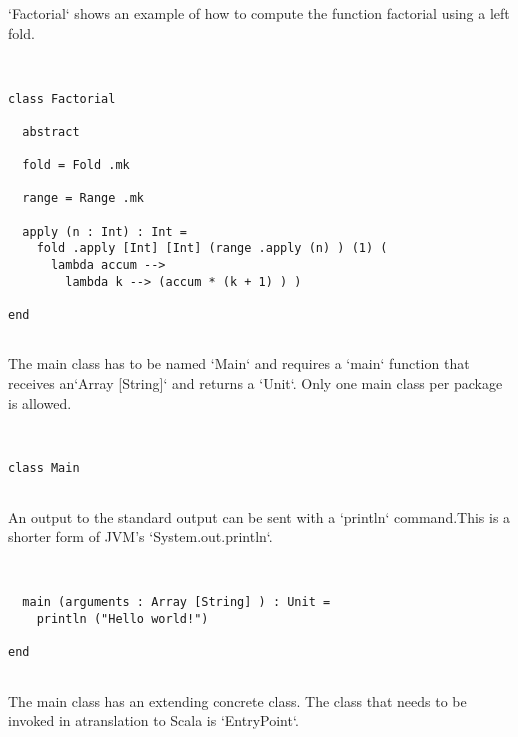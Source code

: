 \documentclass[12pt,a4paper]{article}
\begin{document}
`Factorial` shows an example of how to compute the function factorial using a left fold. 


\begin{lstlisting}


class Factorial

  abstract

  fold = Fold .mk

  range = Range .mk

  apply (n : Int) : Int =
    fold .apply [Int] [Int] (range .apply (n) ) (1) (
      lambda accum -->
        lambda k --> (accum * (k + 1) ) )

end


\end{lstlisting}

The main class has to be named `Main` and requires a `main` function that receives an`Array [String]` and returns a `Unit`. Only one main class per package is allowed. 


\begin{lstlisting}


class Main


\end{lstlisting}

An output to the standard output can be sent with a `println` command.This is a shorter form of JVM's `System.out.println`. 


\begin{lstlisting}


  main (arguments : Array [String] ) : Unit =
    println ("Hello world!")

end


\end{lstlisting}

The main class has an extending concrete class. The class that needs to be invoked in atranslation to Scala is `EntryPoint`. 


\begin{lstlisting}


\end{lstlisting}
\end{document}
